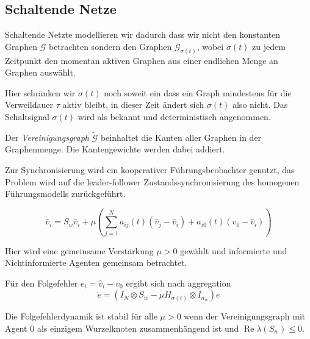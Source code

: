 \subsection{Schaltende Netze}

Schaltende Netzte modellieren wir dadurch dass wir nicht den konstanten
Graphen $\mathcal{G}$ betrachten sondern den Graphen $\mathcal{G}_{\sigma(t)}$, wobei $\sigma(t)$ zu jedem Zeitpunkt den momentan aktiven Graphen
aus einer endlichen Menge an Graphen auswählt.

Hier schränken wir $\sigma(t)$ noch soweit ein dass ein Graph mindestens
für die Verweildauer $\tau$ aktiv bleibt, in dieser Zeit ändert sich
$\sigma(t)$ also nicht.
Das Schaltsignal $\sigma(t)$ wird als bekannt und deterministisch 
angenommen.

Der \emph{Vereinigungsgraph} $\tilde{\mathcal{G}}$ beinhaltet die Kanten
aller Graphen in der Graphenmenge.
Die Kantengewichte werden dabei addiert.

Zur Synchronisierung wird ein kooperativer Führungsbeobachter genutzt,
das Problem wird auf die leader-follower Zustandssynchronisierung
des homogenen Führungsmodells zurückgeführt.

\begin{equation}
    \dot{\hat{v}}_i = S_w \hat{v}_i + \mu \left( \sum_{j=1}^N a_{ij}(t)
    (\hat{v}_j - \hat{v}_i) + a_{i0}(t)(v_0 - \hat{v}_i) \right)   
\end{equation}

Hier wird eine gemeinsame Verstärkung $\mu >0$ gewählt und informierte
und Nichtinformierte Agenten gemeinsam betrachtet.

Für den Folgefehler $e_i = \hat{v}_i - v_0$ ergibt sich nach aggregation
\begin{equation}
    \dot{e} = (I_N \otimes S_w - \mu H_{\sigma(t)} \otimes I_{n_w}) e
\end{equation}

Die Folgefehlerdynamik ist stabil für alle $\mu > 0$ wenn der Vereinigungsgraph
mit Agent 0 als einzigem Wurzelknoten zusammenhängend ist und
$\operatorname{Re}\lambda(S_w) \leq 0$.

